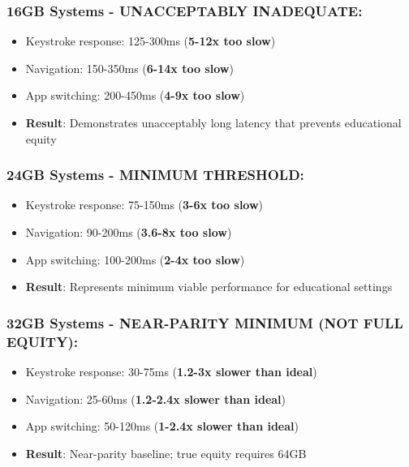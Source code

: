 \subsubsection{16GB Systems - UNACCEPTABLY INADEQUATE:}

\begin{itemize}
	\item Keystroke response: 125-300ms (\textbf{5-12x too slow})
	\item Navigation: 150-350ms (\textbf{6-14x too slow})
	\item App switching: 200-450ms (\textbf{4-9x too slow})
	\item \textbf{Result}: Demonstrates unacceptably long latency that prevents educational equity \supercite{EducationalEquityReport2024}
\end{itemize}


\subsubsection{24GB Systems - MINIMUM THRESHOLD:}

\begin{itemize}
	\item Keystroke response: 75-150ms (\textbf{3-6x too slow})
	\item Navigation: 90-200ms (\textbf{3.6-8x too slow})
	\item App switching: 100-200ms (\textbf{2-4x too slow})
	\item \textbf{Result}: Represents minimum viable performance for educational settings \supercite{EducationalEquityReport2024}
\end{itemize}


\subsubsection{32GB Systems - NEAR-PARITY MINIMUM (NOT FULL EQUITY):}

\begin{itemize}
	\item Keystroke response: 30-75ms (\textbf{1.2-3x slower than ideal})
	\item Navigation: 25-60ms (\textbf{1.2-2.4x slower than ideal})
	\item App switching: 50-120ms (\textbf{1-2.4x slower than ideal})
	\item \textbf{Result}: Near-parity baseline; true equity requires 64GB \supercite{EducationalEquityReport2024}
\end{itemize}


